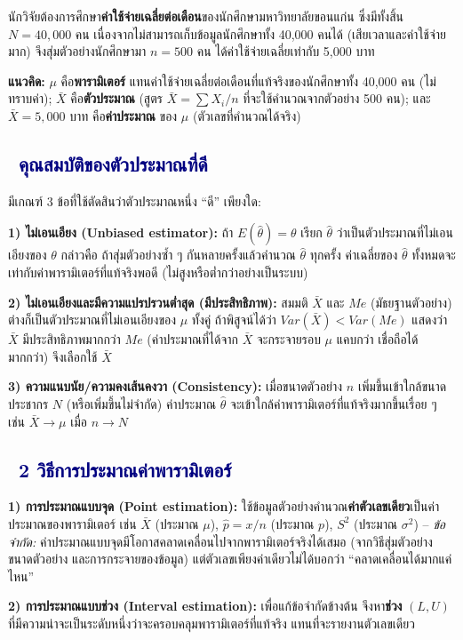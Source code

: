 \documentclass[10pt]{extarticle}
\newcommand{\dist}[1]{\subsection*{\textcolor{navy}{\textbullet\ #1}}}
\newcommand{\case}[1]{\textbf{\textcolor{gold!70!black}{#1}}}
\begin{document}
\begin{qbox}
นักวิจัยต้องการศึกษา\textbf{ค่าใช้จ่ายเฉลี่ยต่อเดือน}ของนักศึกษามหาวิทยาลัยขอนแก่น ซึ่งมีทั้งสิ้น $N=40{,}000$ คน เนื่องจากไม่สามารถเก็บข้อมูลนักศึกษาทั้ง 40,000 คนได้ (เสียเวลาและค่าใช้จ่ายมาก) จึงสุ่มตัวอย่างนักศึกษามา $n=500$ คน ได้ค่าใช้จ่ายเฉลี่ยเท่ากับ 5{,}000 บาท
\end{qbox}
\begin{ideabox}
\textbf{แนวคิด:} $\mu$ คือ\textbf{พารามิเตอร์} แทนค่าใช้จ่ายเฉลี่ยต่อเดือนที่แท้จริงของนักศึกษาทั้ง 40,000 คน (ไม่ทราบค่า); $\bar{X}$ คือ\textbf{ตัวประมาณ} (สูตร $\bar X=\sum X_i/n$ ที่จะใช้คำนวณจากตัวอย่าง 500 คน); และ $\bar{X}=5{,}000$ บาท คือ\textbf{ค่าประมาณ} ของ $\mu$ (ตัวเลขที่คำนวณได้จริง)
\end{ideabox}

\dist{คุณสมบัติของตัวประมาณที่ดี}
มีเกณฑ์ 3 ข้อที่ใช้ตัดสินว่าตัวประมาณหนึ่ง ``ดี'' เพียงใด:

\textbf{1) ไม่เอนเอียง (Unbiased estimator):} ถ้า $E(\hat\theta)=\theta$ เรียก $\hat\theta$ ว่าเป็นตัวประมาณที่ไม่เอนเอียงของ $\theta$ กล่าวคือ ถ้าสุ่มตัวอย่างซ้ำ ๆ กันหลายครั้งแล้วคำนวณ $\hat\theta$ ทุกครั้ง ค่าเฉลี่ยของ $\hat\theta$ ทั้งหมดจะเท่ากับค่าพารามิเตอร์ที่แท้จริงพอดี (ไม่สูงหรือต่ำกว่าอย่างเป็นระบบ)

\textbf{2) ไม่เอนเอียงและมีความแปรปรวนต่ำสุด (มีประสิทธิภาพ):} สมมติ $\bar X$ และ $Me$ (มัธยฐานตัวอย่าง) ต่างก็เป็นตัวประมาณที่ไม่เอนเอียงของ $\mu$ ทั้งคู่ ถ้าพิสูจน์ได้ว่า $Var(\bar X) < Var(Me)$ แสดงว่า $\bar X$ มีประสิทธิภาพมากกว่า $Me$ (ค่าประมาณที่ได้จาก $\bar X$ จะกระจายรอบ $\mu$ แคบกว่า เชื่อถือได้มากกว่า) จึงเลือกใช้ $\bar X$

\textbf{3) ความแนบนัย/ความคงเส้นคงวา (Consistency):} เมื่อขนาดตัวอย่าง $n$ เพิ่มขึ้นเข้าใกล้ขนาดประชากร $N$ (หรือเพิ่มขึ้นไม่จำกัด) ค่าประมาณ $\hat\theta$ จะเข้าใกล้ค่าพารามิเตอร์ที่แท้จริงมากขึ้นเรื่อย ๆ เช่น $\bar X \to \mu$ เมื่อ $n\to N$

\dist{2 วิธีการประมาณค่าพารามิเตอร์}
\case{1) การประมาณแบบจุด (Point estimation):} ใช้ข้อมูลตัวอย่างคำนวณ\textbf{ค่าตัวเลขเดียว}เป็นค่าประมาณของพารามิเตอร์ เช่น $\bar{X}$ (ประมาณ $\mu$), $\hat{p}=x/n$ (ประมาณ $p$), $S^2$ (ประมาณ $\sigma^2$) -- \textit{ข้อจำกัด:} ค่าประมาณแบบจุดมีโอกาสคลาดเคลื่อนไปจากพารามิเตอร์จริงได้เสมอ (จากวิธีสุ่มตัวอย่าง ขนาดตัวอย่าง และการกระจายของข้อมูล) แต่ตัวเลขเพียงค่าเดียวไม่ได้บอกว่า ``คลาดเคลื่อนได้มากแค่ไหน''

\case{2) การประมาณแบบช่วง (Interval estimation):} เพื่อแก้ข้อจำกัดข้างต้น จึงหา\textbf{ช่วง} $(L,U)$ ที่มีความน่าจะเป็นระดับหนึ่งว่าจะครอบคลุมพารามิเตอร์ที่แท้จริง แทนที่จะรายงานตัวเลขเดียว
\end{document}
